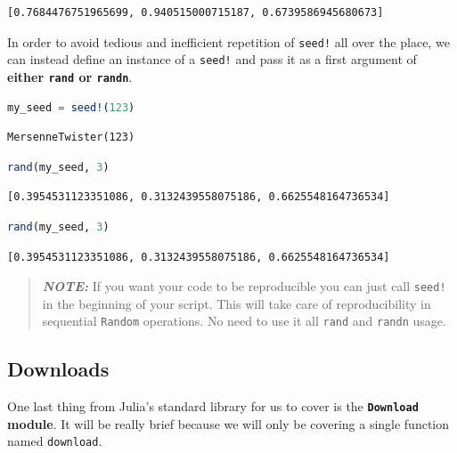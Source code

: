 \documentclass[
  notoc %
]{tufte-book}
\newcommand{\passthrough}[1]{#1}
\begin{document}
\begin{lstlisting}[language=Output]
[0.7684476751965699, 0.940515000715187, 0.6739586945680673]
\end{lstlisting}

In order to avoid tedious and inefficient repetition of
\passthrough{\lstinline"seed!"} all over the place, we can instead
define an instance of a \passthrough{\lstinline"seed!"} and pass it as a
first argument of \textbf{either \passthrough{\lstinline!rand!} or
\passthrough{\lstinline!randn!}}.

\begin{lstlisting}[language=Julia]
my_seed = seed!(123)
\end{lstlisting}

\begin{lstlisting}[language=Output]
MersenneTwister(123)
\end{lstlisting}

\begin{lstlisting}[language=Julia]
rand(my_seed, 3)
\end{lstlisting}

\begin{lstlisting}[language=Output]
[0.3954531123351086, 0.3132439558075186, 0.6625548164736534]
\end{lstlisting}

\begin{lstlisting}[language=Julia]
rand(my_seed, 3)
\end{lstlisting}

\begin{lstlisting}[language=Output]
[0.3954531123351086, 0.3132439558075186, 0.6625548164736534]
\end{lstlisting}

\begin{quote}
\textbf{\emph{NOTE:}} If you want your code to be reproducible you can
just call \passthrough{\lstinline"seed!"} in the beginning of your
script. This will take care of reproducibility in sequential
\passthrough{\lstinline!Random!} operations. No need to use it all
\passthrough{\lstinline!rand!} and \passthrough{\lstinline!randn!}
usage.
\end{quote}

\hypertarget{sec:downloads}{%
\subsection{Downloads}\label{sec:downloads}}

One last thing from Julia's standard library for us to cover is the
\textbf{\passthrough{\lstinline!Download!} module}. It will be really
brief because we will only be covering a single function named
\passthrough{\lstinline!download!}.
\end{document}
